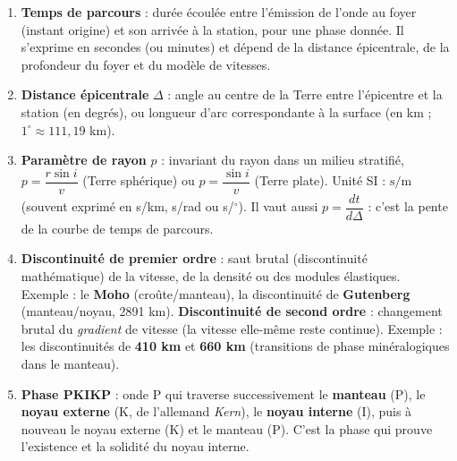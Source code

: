 \documentclass[11pt]{article}
\begin{document}
\begin{corrige}
\begin{enumerate}
    \item \textbf{Temps de parcours} : durée écoulée entre l'émission de l'onde au foyer (instant origine) et son arrivée à la station, pour une phase donnée. Il s'exprime en secondes (ou minutes) et dépend de la distance épicentrale, de la profondeur du foyer et du modèle de vitesses.
    \item \textbf{Distance épicentrale} $\Delta$ : angle au centre de la Terre entre l'épicentre et la station (en degrés), ou longueur d'arc correspondante à la surface (en km ; $1^\circ \approx 111,19$ km).
    \item \textbf{Paramètre de rayon} $p$ : invariant du rayon dans un milieu stratifié, $p = \dfrac{r \sin i}{v}$ (Terre sphérique) ou $p = \dfrac{\sin i}{v}$ (Terre plate). Unité SI : $\mathrm{s/m}$ (souvent exprimé en s/km, s/rad ou s/$^\circ$). Il vaut aussi $p = \dfrac{dt}{d\Delta}$ : c'est la pente de la courbe de temps de parcours.
    \item \textbf{Discontinuité de premier ordre} : saut brutal (discontinuité mathématique) de la vitesse, de la densité ou des modules élastiques. Exemple : le \textbf{Moho} (croûte/manteau), la discontinuité de \textbf{Gutenberg} (manteau/noyau, 2891 km). \textbf{Discontinuité de second ordre} : changement brutal du \emph{gradient} de vitesse (la vitesse elle-même reste continue). Exemple : les discontinuités de \textbf{410 km} et \textbf{660 km} (transitions de phase minéralogiques dans le manteau).
    \item \textbf{Phase PKIKP} : onde P qui traverse successivement le \textbf{manteau} (P), le \textbf{noyau externe} (K, de l'allemand \emph{Kern}), le \textbf{noyau interne} (I), puis à nouveau le noyau externe (K) et le manteau (P). C'est la phase qui prouve l'existence et la solidité du noyau interne.
\end{enumerate}
\end{corrige}
\end{document}
